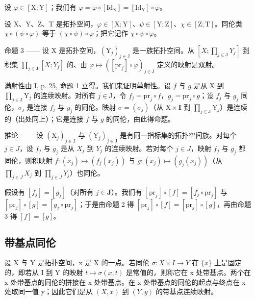 设 \(\varphi\in[\mathrm{X};\mathrm{Y}]\)；我们有 \(\varphi=\varphi\circ[\mathrm{Id}_{\mathrm{X}}]=[\mathrm{Id}_{\mathrm{Y}}]\circ\varphi\)。

设 X、Y、Z、T 是拓扑空间，\(\varphi \in [\mathrm{X};\mathrm{Y}]\)、\(\psi \in [\mathrm{Y};\mathrm{Z}]\)、\(\chi \in [\mathrm{Z};\mathrm{T}]\)。同伦类 \(\chi \circ (\psi \circ \varphi)\) 等于 \((\chi \circ \psi) \circ \varphi\)；把它记作 \(\chi \circ \psi \circ \varphi\)。

命题 3 —— 设 X 是拓扑空间，\((\mathrm{Y}_{j})_{j\in\mathrm{J}}\) 是一族拓扑空间。从 \([X;\prod_{j\in\mathrm{J}}Y_{j}]\) 到积集 \(\prod_{j\in\mathrm{J}}[X;Y_{j}]\) 的、由 \(\varphi\mapsto([\mathrm{pr}_{j}]\circ\varphi)_{j\in\mathrm{J}}\) 定义的映射是双射。

满射性由 I, p. 25, 命题 1 立得。我们来证明单射性。设 \(f\) 与 \(g\) 是从 X 到 \(\prod_{j \in \mathrm{J}} \mathrm{Y}_j\) 的连续映射。对所有 \(j \in \mathrm{J}\)，令 \(f_j = \mathrm{pr}_j \circ f\)，\(g_j = \mathrm{pr}_j \circ g\)；设 \(f_j\) 与 \(g_j\) 同伦，\(\sigma_j\) 是连接 \(f_j\) 与 \(g_j\) 的同伦。映射 \(\sigma = (\sigma_j)\)（从 \(\mathrm{X} \times \mathbf{I}\) 到 \(\prod_{j \in \mathrm{J}} \mathrm{Y}_j\)）是连续的（出处同上）；它是连接 \(f\) 与 \(g\) 的同伦，由此得命题。

推论 —— 设 \((\mathrm{X}_{j})_{j\in\mathrm{J}}\) 与 \((\mathrm{Y}_{j})_{j\in\mathrm{J}}\) 是有同一指标集的拓扑空间族。对每个 \(j\in J\)，设 \(f_{j}\) 与 \(g_{j}\) 是从 \(X_{j}\) 到 \(Y_{j}\) 的连续映射。若对每个 \(j\in J\)，映射 \(f_{j}\) 与 \(g_{j}\) 都同伦，则积映射 \(f\colon(x_{j})\mapsto(f_{j}(x_{j}))\) 与 \(g\colon(x_{j})\mapsto(g_{j}(x_{j}))\)（从 \(\prod_{j\in J}X_{j}\) 到 \(\prod_{j\in J}Y_{j}\)）也同伦。

假设有 \([f_j] = [g_j]\)（对所有 \(j \in \mathbf{J}\)）。我们有 \([\mathrm{pr}_j] \circ [f] = [f_j \circ \mathrm{pr}_j]\) 与 \([\mathrm{pr}_j] \circ [g] = [g_j \circ \mathrm{pr}_j]\)；于是由命题 2 得 \([\mathrm{pr}_j] \circ [f] = [\mathrm{pr}_j] \circ [g]\)，再由命题 3 得 \([f] = [g]\)。

\subsection{带基点同伦}

设 X 与 Y 是拓扑空间，x 是 X 的一点。若同伦 \(\sigma\colon X \times I \to Y\) 在 \(\{x\}\) 上是固定的，即若从 I 到 Y 的映射 \(t \mapsto \sigma(x, t)\) 是常值的，则称它在 x 处带基点。两个在 x 处带基点的同伦的拼接在 x 处带基点。在 x 处带基点的同伦的起点与终点在 x 处取同一值 y；因此它们是从 \((X, x)\) 到 \((Y, y)\) 的带基点连续映射。

